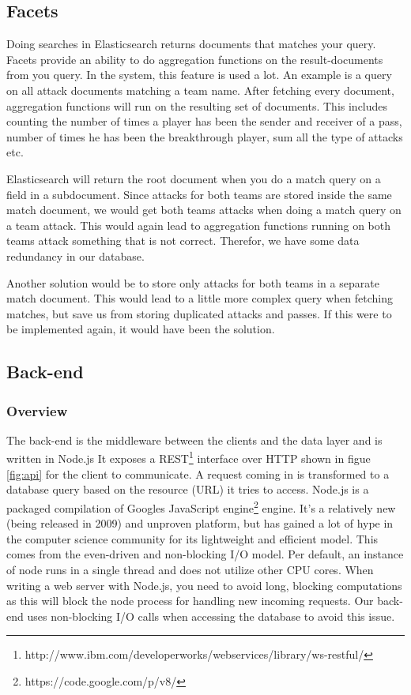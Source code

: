 \subsection{Facets}
\label{sec:facets}
Doing searches in Elasticsearch returns documents that matches your query. Facets provide an ability to do aggregation functions on the result-documents from you query. In the system, this feature is used a lot. An example is a query on all attack documents matching a team name. After fetching every document, aggregation functions will run on the resulting set of documents. This includes counting the number of times a player has been the sender and receiver of a pass, number of times he has been the breakthrough player, sum all the type of attacks etc. 

Elasticsearch will return the root document when you do a match query on a field in a subdocument. Since attacks for both teams are stored inside the same match document, we would get both teams attacks when doing a match query on a team attack. This would again lead to aggregation functions running on both teams attack something that is not correct. Therefor, we have some data redundancy in our database.

Another solution would be to store only attacks for both teams in a separate match document. This would lead to a little more complex query when fetching matches, but save us from storing duplicated attacks and passes. If this were to be implemented again, it would have been the solution.


\subsection{Back-end}

\subsubsection{Overview}	
The back-end is the middleware between the clients and the data layer and is written in Node.js\cite{node.js} It exposes a \ac{REST}\footnote{http://www.ibm.com/developerworks/webservices/library/ws-restful/} interface over \ac{HTTP} shown in figue \ref{fig:api} for the client to communicate. A request coming in is transformed to a database query based on the resource (URL) it tries to access. Node.js is a packaged compilation of Googles JavaScript engine\footnote{https://code.google.com/p/v8/} engine. It’s a relatively new (being released in 2009) and unproven platform, but has gained a lot of hype in the computer science community for its lightweight and efficient model. This comes from the even-driven and non-blocking I/O model. Per default, an instance of node runs in a single thread and does not utilize other CPU cores. When writing a web server with Node.js, you need to avoid long, blocking computations as this will block the node process for handling new incoming requests. Our back-end uses non-blocking I/O calls when accessing the database to avoid this issue.

